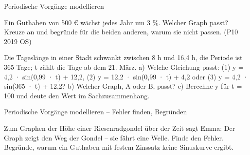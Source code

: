 \begin{aufgabe}{Periodische Vorgänge modellieren}
\begin{teile}
\teil Ein Guthaben von 500 € wächst jedes Jahr um 3 \%. Welcher Graph passt? Kreuze an und begründe für die beiden anderen, warum sie nicht passen. \hfill (P10 2019 OS)\\ 

\begin{ksys}[xmin=0,xmax=40,ymin=0,ymax=2000,xstep=10,ystep=500,xlabel=Jahre,ylabel=€,ablesen]\end{ksys} \begin{ksys}[xmin=0,xmax=40,ymin=0,ymax=2000,xstep=10,ystep=500,xlabel=Jahre,ylabel=€,ablesen]\end{ksys} \begin{ksys}[xmin=0,xmax=40,ymin=0,ymax=2000,xstep=10,ystep=500,xlabel=Jahre,ylabel=€,ablesen]\end{ksys}
\teil Die Tageslänge in einer Stadt schwankt zwischen 8 h und 16,4 h, die Periode ist 365 Tage; t zählt die Tage ab dem 21. März. a) Welche Gleichung passt: (1) y = 4,2 · sin(0,99 · t) + 12,2, (2) y = 12,2 · sin(0,99 · t) + 4,2 oder (3) y = 4,2 · sin(365 · t) + 12,2? b) Welcher Graph, A oder B, passt? c) Berechne y für t = 100 und deute den Wert im Sachzusammenhang.

\begin{ksys}[xmin=0,xmax=360,ymin=0,ymax=22,xstep=60,ystep=2,xlabel=t in Tagen,ylabel=Stunden,ablesen]\end{ksys}
\end{teile}
\end{aufgabe}

\begin{aufgabe}{Periodische Vorgänge modellieren – Fehler finden, Begründen}
\begin{teile}
\teil Zum Graphen der Höhe einer Riesenradgondel über der Zeit sagt Emma: Der Graph zeigt den Weg der Gondel – sie fährt eine Welle. Finde den Fehler.
\teil Begründe, warum ein Guthaben mit festem Zinssatz keine Sinuskurve ergibt.
\end{teile}
\end{aufgabe}

